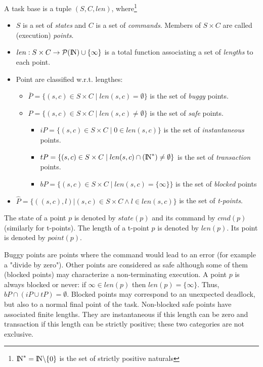 \documentclass{article}
\newcommand{\NAT}{\mbox{\normalfont I$\!$N}}
\begin{document}
\begin{definition}\label{def-cb} A task base is a tuple $(S,C,len)$, where\footnote{$\NAT^*=\NAT\backslash\{0\}$ is the set of strictly positive naturals} \par
\begin{itemize}
\item $S$ is a set of {\em states} and $C$ is a set of {\em commands}. Members of $S\times C$ are called {\small (execution)} {\em points}.
\item $len: S\times C\rightarrow {\cal P}(\NAT)\cup\{\infty\}$ is a total function associating a set of {\em lengths} to each point.
\item Point are classified w.r.t. lengthes:
   \begin{itemize}
	 \item $\bar P=\{(s,c)\in S\times C\mid len(s,c)=\emptyset\}$ is the set of {\em buggy} points.
	 \item $P=\{(s,c)\in S\times C\mid len(s,c)\neq\emptyset\}$ is the set of {\em safe} points.
	   \begin{itemize}
		 \item $iP=\{(s,c)\in S\times C\mid 0\in len(s,c)\}$ is the set of {\em instantaneous} points.
		 \item $tP=\{(s,c)\in S\times C\mid len(s,c)\cap(\NAT^*)\neq\emptyset\}$ is the set of {\em transaction} points.
		 \item $bP=\{(s,c)\in S\times C\mid len(s,c)=\{\infty\}\}$ is the set of {\em blocked} points
		 \end{itemize}
	 \end{itemize}
\item $\hat P=\{((s,c),l)|(s,c)\in S\times C \wedge l\in len(s,c)\}$ is the set of {\em t-points}.
\end{itemize}
\vspace{1mm}
The state of a point $p$ is denoted by $state(p)$ and its command by $cmd(p)$ (similarly for t-points). The length of a t-point $p$ is denoted by $len(p)$. Its point is denoted by $point(p)$.
\end{definition}
Buggy points are points where the command would lead to an error (for example a "divide by zero"). Other points are considered as safe although some of them (blocked points) may characterize a non-terminating execution. A point $p$ is always blocked or never: if $\infty\in len(p)$ then $len(p)=\{\infty\}$. Thus, $bP\cap(iP\cup tP)=\emptyset$. Blocked points may correspond to an unexpected deadlock, but also to a normal final point of the task. Non-blocked safe points have associated finite lengths. They are instantaneous if this length can be zero and transaction if this length can be strictly positive; these two categories are not exclusive. 
\end{document}
